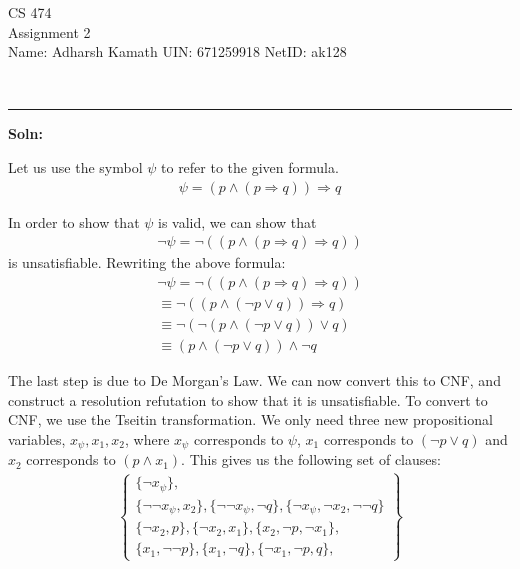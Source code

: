 \documentclass[12pt,letterpaper, onecolumn]{exam}
\begin{document}
\begingroup
\centering
\LARGE CS 474\\
\large Assignment 2 \\[0.5em]
\endgroup
\begingroup
\normalsize \quad\quad\quad Name: Adharsh Kamath \quad\quad\quad  UIN: 671259918 \quad\quad\quad  NetID: ak128 \par\
\endgroup
\rule{17cm}{0.4pt}
\pointsdroppedatright   %
\printanswers
\renewcommand{\solutiontitle}{\noindent\textbf{Soln:}\enspace}
\newcommand{\cheading}[1]{{\underline{\textit{#1}}}}

\renewcommand{\questionshook}{%
	\setlength{\leftmargin}{18pt}%
	\setlength{\labelwidth}{-\labelsep}%
}
\begin{questions}
	\question[]
	\solutiontitle

	Let us use the symbol $\psi$ to refer to the given formula.
	\begin{align*}
		\psi = \left( p \land  (p \Rightarrow q) \right) \Rightarrow q
	\end{align*}

	In order to show that $\psi$ is valid, we can show that 
	\begin{align*}
		\neg \psi = \neg \left( (p \land  (p \Rightarrow q)  \Rightarrow q) \right)
	\end{align*}
	is unsatisfiable. Rewriting the above formula:
	\begin{align*}
		\neg \psi = \neg \left( (p \land  (p \Rightarrow q)  \Rightarrow q) \right) \\
					\equiv \neg \left( (p \land  (\neg p \lor q) ) \Rightarrow q \right) \\
					\equiv \neg \left( \neg (p \land  (\neg p \lor q) ) \lor q \right) \\
					\equiv (p \land  (\neg p \lor q) ) \land \neg q
	\end{align*}

	The last step is due to De Morgan's Law. We can now convert this to CNF, and construct a resolution refutation to show that it is unsatisfiable.
	To convert to CNF, we use the Tseitin transformation. We only need three new propositional variables, $x_{\psi}, x_1, x_2$,
	where $x_{\psi}$ corresponds to $\psi$, $x_1$ corresponds to $(\neg p \lor q)$ and $x_2$ corresponds to $(p \land x_1)$.
	This gives us the following set of clauses:
	\begin{align*}
		\left .
			\begin{cases}
					\{ \neg x_{\psi} \}, \\
					\{ \neg \neg x_{\psi}, x_2 \}, \{ \neg \neg x_{\psi}, \neg q \}, \{ \neg x_{\psi}, \neg x_2, \neg \neg q \} \\
					\{ \neg x_2, p \}, \{ \neg x_2, x_1 \}, \{ x_2, \neg p, \neg x_1  \}, \\
					\{ x_1, \neg \neg p \}, \{ x_1, \neg q \}, \{ \neg x_1, \neg p, q \}, 
			\end{cases}
		\right\}
	\end{align*}


\end{questions}
\end{document}

